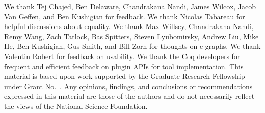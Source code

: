 \documentclass[sigplan,10pt,review,anonymous]{acmart}\settopmatter{printfolios=true,printccs=false,printacmref=false}
\begin{document}









\begin{acks}                            %
We thank Tej Chajed, Ben Delaware, Chandrakana Nandi, James Wilcox, Jacob Van Geffen,
and Ben Kushigian for feedback. %
We thank Nicolas Tabareau for helpful discussions about equality.
We thank Max Willsey, Chandrakana Nandi, Remy Wang, Zach Tatlock, Bas Spitters, Steven Lyubomirsky, Andrew Liu, Mike He, Ben Kushigian, 
Gus Smith, and Bill Zorn for thoughts on e-graphs.
We thank Valentin Robert for feedback on usability.
We thank the Coq developers for frequent and efficient feedback on plugin APIs for tool implementation.
This material is based upon work supported by the  Graduate Research Fellowship under Grant No.~. Any opinions, findings, and conclusions or recommendations expressed in this material are those of the authors and do not necessarily reflect the views of the National Science Foundation.
\end{acks}






\end{document}

